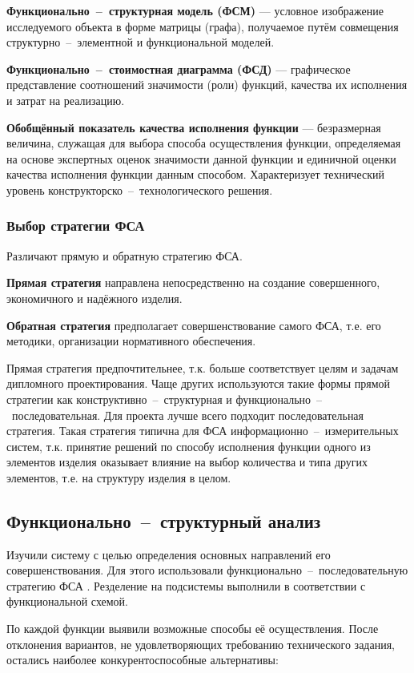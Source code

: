 \textbf{Функционально~--~структурная модель (ФСМ)} --- условное изображение
исследуемого объекта в форме матрицы (графа),
получаемое путём совмещения структурно~--~элементной и функциональной моделей.

\textbf{Функционально~--~стоимостная диаграмма (ФСД)} --- графическое
представление соотношений значимости (роли) функций, качества их
исполнения и затрат на реализацию.

\textbf{Обобщённый показатель качества исполнения функции}
--- безразмерная величина, служащая для выбора способа осуществления функции,
определяемая на основе экспертных оценок значимости данной функции и единичной
оценки качества исполнения функции данным способом.
Характеризует технический уровень конструкторско~--~технологического решения.

\subsubsection{Выбор стратегии ФСА}
Различают прямую и обратную стратегию ФСА.

\textbf{Прямая стратегия}
направлена непосредственно на создание совершенного, экономичного и надёжного
изделия.

\textbf{Обратная стратегия}
предполагает совершенствование самого ФСА, т.е. его методики, организации
нормативного обеспечения.

Прямая стратегия предпочтительнее, т.к. больше соответствует целям и задачам
дипломного проектирования.
Чаще других используются такие формы прямой стратегии как
конструктивно~--~структурная и функционально~--~последовательная.
Для проекта лучше всего подходит последовательная стратегия.
Такая стратегия типична для ФСА информационно~--~измерительных систем, т.к.
принятие решений по способу исполнения функции одного из элементов изделия
оказывает влияние на выбор количества и типа других элементов, т.е. на структуру
изделия в целом.

\newpage
\subsection{Функционально~--~структурный анализ}
Изучили систему с целью определения основных направлений его совершенствования.
Для этого использовали функционально~--~последовательную стратегию ФСА
\cite[стр. 11]{econ_FSA}.
Резделение на подсистемы выполнили в соответствии с функциональной схемой.

По каждой функции выявили возможные способы её осуществления.
После отклонения вариантов, не удовлетворяющих требованию технического
задания, остались наиболее конкурентоспособные альтернативы:

